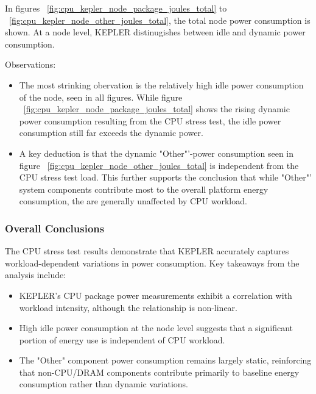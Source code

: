 In figures ~\ref{fig:cpu_kepler_node_package_joules_total} to ~\ref{fig:cpu_kepler_node_other_joules_total}, the total node power consumption is shown. At a node level, KEPLER distinugishes between idle and dynamic power consumption.

Observations:
\begin{itemize}
\item The most strinking obervation is the relatively high idle power consumption of the node, seen in all figures. While figure ~\ref{fig:cpu_kepler_node_package_joules_total} shows the rising dynamic power consumption resulting from the CPU stress test, the idle power consumption still far exceeds the dynamic power.
\item A key deduction is that the dynamic "Other"'-power consumption seen in figure ~\ref{fig:cpu_kepler_node_other_joules_total} is independent from the CPU stress test load. This further supports the conclusion that while "Other"' system components contribute most to the overall platform energy consumption, the are generally unaffected by CPU workload.
\end{itemize}

\subsubsection{Overall Conclusions}
The CPU stress test results demonstrate that KEPLER accurately captures workload-dependent variations in power consumption. Key takeaways from the analysis include:
\begin{itemize}
    \item KEPLER's CPU package power measurements exhibit a correlation with workload intensity, although the relationship is non-linear.
    \item High idle power consumption at the node level suggests that a significant portion of energy use is independent of CPU workload.
    \item The "Other" component power consumption remains largely static, reinforcing that non-CPU/DRAM components contribute primarily to baseline energy consumption rather than dynamic variations.
\end{itemize}


    

